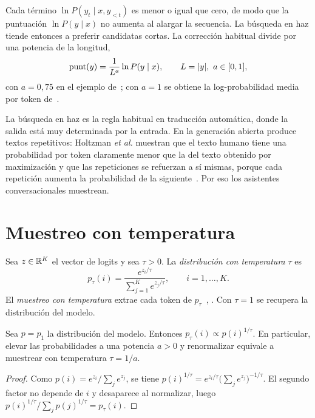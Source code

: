 \begin{observacion}\label{obs:longitud}
Cada término $\ln P(y_t\mid x,y_{<t})$ es menor o igual que cero, de modo que la puntuación $\ln P(y\mid x)$ no aumenta al alargar la secuencia. La búsqueda en haz tiende entonces a preferir candidatas cortas. La corrección habitual divide por una potencia de la longitud,
\[
\mathrm{punt}(y)=\frac{1}{L^{a}}\ln P(y\mid x),\qquad L=\lvert y\rvert,\ a\in[0,1],
\]
con $a=0{,}75$ en el ejemplo de~\cite[§10.8.3]{d2l}; con $a=1$ se obtiene la log-probabilidad media por token de~\cite[§13.4]{jm3}.
\end{observacion}

\begin{observacion}[Degeneración]
La búsqueda en haz es la regla habitual en traducción automática, donde la salida está muy determinada por la entrada. En la generación abierta produce textos repetitivos: Holtzman \emph{et al.} muestran que el texto humano tiene una probabilidad por token claramente menor que la del texto obtenido por maximización y que las repeticiones se refuerzan a sí mismas, porque cada repetición aumenta la probabilidad de la siguiente~\cite[§4.3]{holtzman}. Por eso los asistentes conversacionales muestrean.
\end{observacion}

\section{Muestreo con temperatura}

\begin{definicion}\label{def:temperatura}
Sea $z\in\mathbb{R}^{K}$ el vector de logits y sea $\tau>0$. La \emph{distribución con temperatura} $\tau$ es
\[
p_\tau(i)=\frac{e^{z_i/\tau}}{\sum_{j=1}^{K}e^{z_j/\tau}},\qquad i=1,\dots,K.
\]
El \emph{muestreo con temperatura} extrae cada token de $p_\tau$~\cite[§7.6.3]{jm3}, \cite[§3.3]{holtzman}. Con $\tau=1$ se recupera la distribución del modelo.
\end{definicion}

\begin{proposicion}\label{prop:potencia}
Sea $p=p_1$ la distribución del modelo. Entonces $p_\tau(i)\propto p(i)^{1/\tau}$. En particular, elevar las probabilidades a una potencia $a>0$ y renormalizar equivale a muestrear con temperatura $\tau=1/a$.
\end{proposicion}

\begin{proof}
Como $p(i)=e^{z_i}/\sum_j e^{z_j}$, se tiene $p(i)^{1/\tau}=e^{z_i/\tau}\bigl(\sum_j e^{z_j}\bigr)^{-1/\tau}$. El segundo factor no depende de $i$ y desaparece al normalizar, luego $p(i)^{1/\tau}\big/\sum_j p(j)^{1/\tau}=p_\tau(i)$.
\end{proof}

